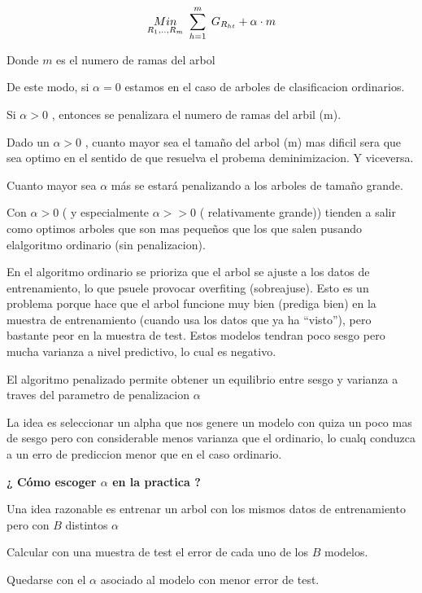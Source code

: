 \documentclass[
  11pt,
  a4paper,
]{article}
\begin{document}
\[ \underset{R_1,..,R_m}{Min}  \hspace{0.12cm}  \sum_{h=1}^{m} \hspace{0.1cm} G_{R_{ht}} + \alpha \cdot m \]

Donde \(m\) es el numero de ramas del arbol

De este modo, si \(\alpha = 0\) estamos en el caso de arboles de
clasificacion ordinarios.

Si \(\alpha > 0\) , entonces se penalizara el numero de ramas del arbil
(m).

Dado un \(\alpha >0\) , cuanto mayor sea el tamaño del arbol (m) mas
dificil sera que sea optimo en el sentido de que resuelva el probema
deminimizacion. Y viceversa.

Cuanto mayor sea \(\alpha\) más se estará penalizando a los arboles de
tamaño grande.

Con \(\alpha >0\) ( y especialmente \(\alpha >> 0\) ( relativamente
grande)) tienden a salir como optimos arboles que son mas pequeños que
los que salen pusando elalgoritmo ordinario (sin penalizacion).

En el algoritmo ordinario se prioriza que el arbol se ajuste a los datos
de entrenamiento, lo que psuele provocar overfiting (sobreajuse). Esto
es un problema porque hace que el arbol funcione muy bien (prediga bien)
en la muestra de entrenamiento (cuando usa los datos que ya ha
``visto''), pero bastante peor en la muestra de test. Estos modelos
tendran poco sesgo pero mucha varianza a nivel predictivo, lo cual es
negativo.

El algoritmo penalizado permite obtener un equilibrio entre sesgo y
varianza a traves del parametro de penalizacion \(\alpha\)

La idea es seleccionar un alpha que nos genere un modelo con quiza un
poco mas de sesgo pero con considerable menos varianza que el ordinario,
lo cualq conduzca a un erro de prediccion menor que en el caso
ordinario.

\vspace{0.15cm}

\textbf{¿ Cómo escoger \(\alpha\) en la practica ?}

Una idea razonable es entrenar un arbol con los mismos datos de
entrenamiento pero con \(B\) distintos \(\alpha\)

Calcular con una muestra de test el error de cada uno de los \(B\)
modelos.

Quedarse con el \(\alpha\) asociado al modelo con menor error de test.
\end{document}
